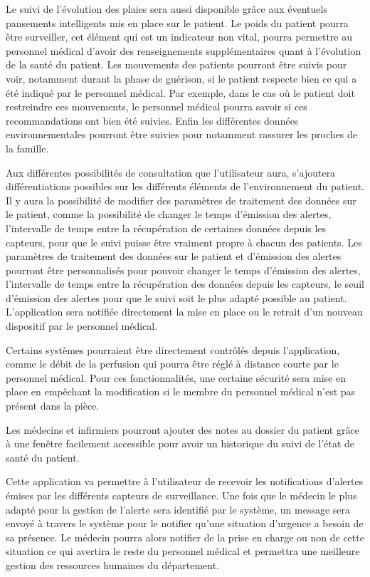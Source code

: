 Le suivi de l’évolution des plaies sera aussi disponible grâce aux éventuels pansements intelligents mis en place sur le patient.
Le poids du patient pourra être surveiller, cet élément qui est un indicateur non vital, pourra permettre au personnel médical
d’avoir des renseignements supplémentaires quant à l’évolution de la santé du patient. Les mouvements des patients pourront être
suivis pour voir, notamment durant la phase de guérison, si le patient respecte bien ce qui a été indiqué par le personnel
médical. Par exemple, dans le cas où le patient doit restreindre ces mouvements, le personnel médical pourra savoir si ces
recommandations ont bien été suivies. Enfin les différentes données environnementales pourront être suivies pour notamment rassurer
les proches de la famille.

Aux différentes possibilités de consultation que l’utilisateur aura, s’ajoutera différentiations possibles sur les différents
éléments de l’environnement du patient. Il y aura la possibilité de modifier des paramètres de traitement des données sur le
patient, comme la possibilité de changer le temps d’émission des alertes, l’intervalle de temps entre la récupération de certaines
données depuis les capteurs, pour que le suivi puisse être vraiment propre à chacun des patients. Les paramètres de
traitement des données sur le patient et d’émission des alertes pourront être personnalisés pour pouvoir changer le temps
d’émission des alertes, l’intervalle de temps entre la récupération des données depuis les capteurs, le seuil d’émission des
alertes pour que le suivi soit le plus adapté possible au patient. L’application sera notifiée directement la mise en place ou le
retrait d’un nouveau dispositif par le personnel médical. 

Certains systèmes pourraient être directement contrôlés depuis l’application, comme le débit de la perfusion qui pourra être réglé à distance courte par le personnel médical. Pour ces fonctionnalités, une certaine sécurité sera mise en place en empêchant la modification si le membre du personnel médical n’est pas présent dans la pièce.

Les médecins et infirmiers pourront ajouter des notes au dossier du patient grâce à une fenêtre facilement accessible pour avoir un historique du suivi de l’état de santé du patient.

Cette application va permettre à l’utilisateur de recevoir les notifications d’alertes émises par les différents capteurs de
surveillance. Une fois que le médecin le plus adapté pour la gestion de l’alerte sera identifié par le système, un message sera
envoyé à travers le système pour le notifier  qu’une situation d’urgence a besoin de sa présence. Le médecin pourra alors notifier
de la prise en charge ou non de cette situation ce qui avertira le reste du personnel médical et permettra une meilleure gestion des ressources humaines du département.
